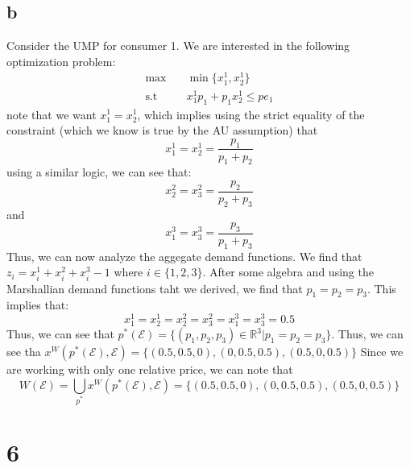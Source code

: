 \documentclass[11pt]{article}
\newcommand{\R}{\mathbb{R}}
\newcommand{\st}{\text{s.t}}
\begin{document}
\subsection*{b}
Consider the UMP for consumer 1. We are interested in the following optimization problem:
\begin{align*}
    \max & \quad \min\{x_1^1, x_2^1\}\\
    \st & \quad x_1^1 p_1 + p_1x_2^1 \leq p e_1
\end{align*}
note that we want $x_1^1 = x_2^1$, which implies using the strict equality of the constraint (which we know is true by the AU assumption) that 
\[
x_1^1 = x_2^1 = \frac{p_1}{p_1 + p_2}
\]
using a similar logic, we can see that:
\[
x_2^2 = x_3^2 = \frac{p_2}{p_2+p_3}
\]
and
\[
x_1^3 = x_3^3 = \frac{p_3}{p_1+p_3}
\]
Thus, we can now analyze the aggegate demand functions. 
We find that $z_i = x_i^1 + x_i^2 + x_i^3 - 1$ where $i \in \{1,2,3\}$. After some algebra and using the Marshallian demand functions taht we derived, we find that $p_1 = p_2 = p_3$. This implies that:
\[
    x_1^1 = x_2^1 = x_2^2 = x_3^2 = x_1^3 = x_3^3 = 0.5
\]
Thus, we can see that $p^*(\mathcal{E}) = \{(p_1, p_2, p_3) \in \R^3 | p_1 = p_2 = p_3\}$. Thus, we can see tha $x^W(p^*(\mathcal{E}), \mathcal{E}) = \{ (0.5,0.5,0), (0, 0.5, 0.5), (0.5, 0, 0.5)\}$ Since we are working with only one relative price, we can note that 
\[
    W(\mathcal{E}) = \bigcup_{p^*} x^W(p^*(\mathcal{E}), \mathcal{E}) = \{ (0.5,0.5,0), (0, 0.5, 0.5), (0.5, 0, 0.5)\}
\]
\section*{6}
\end{document}
